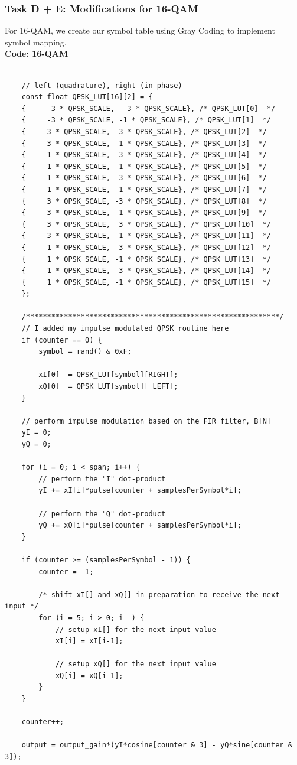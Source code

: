\documentclass{article}
\begin{document}
\subsubsection{Task D + E: Modifications for 16-QAM}
For 16-QAM, we create our symbol table using Gray Coding to implement symbol mapping.
\\
\textbf{Code: 16-QAM}

\begin{verbatim}

	// left (quadrature), right (in-phase)
	const float QPSK_LUT[16][2] = {
	{     -3 * QPSK_SCALE,  -3 * QPSK_SCALE}, /* QPSK_LUT[0]  */
	{     -3 * QPSK_SCALE, -1 * QPSK_SCALE}, /* QPSK_LUT[1]  */
	{    -3 * QPSK_SCALE,  3 * QPSK_SCALE}, /* QPSK_LUT[2]  */
	{    -3 * QPSK_SCALE,  1 * QPSK_SCALE}, /* QPSK_LUT[3]  */
	{    -1 * QPSK_SCALE, -3 * QPSK_SCALE}, /* QPSK_LUT[4]  */
	{    -1 * QPSK_SCALE, -1 * QPSK_SCALE}, /* QPSK_LUT[5]  */
	{    -1 * QPSK_SCALE,  3 * QPSK_SCALE}, /* QPSK_LUT[6]  */
	{    -1 * QPSK_SCALE,  1 * QPSK_SCALE}, /* QPSK_LUT[7]  */
	{     3 * QPSK_SCALE, -3 * QPSK_SCALE}, /* QPSK_LUT[8]  */
	{     3 * QPSK_SCALE, -1 * QPSK_SCALE}, /* QPSK_LUT[9]  */
	{     3 * QPSK_SCALE,  3 * QPSK_SCALE}, /* QPSK_LUT[10]  */
	{     3 * QPSK_SCALE,  1 * QPSK_SCALE}, /* QPSK_LUT[11]  */
	{     1 * QPSK_SCALE, -3 * QPSK_SCALE}, /* QPSK_LUT[12]  */
	{     1 * QPSK_SCALE, -1 * QPSK_SCALE}, /* QPSK_LUT[13]  */
	{     1 * QPSK_SCALE,  3 * QPSK_SCALE}, /* QPSK_LUT[14]  */
	{     1 * QPSK_SCALE, -1 * QPSK_SCALE}, /* QPSK_LUT[15]  */
	};

	/************************************************************/
	// I added my impulse modulated QPSK routine here
	if (counter == 0) {
		symbol = rand() & 0xF;

		xI[0]  = QPSK_LUT[symbol][RIGHT];  
		xQ[0]  = QPSK_LUT[symbol][ LEFT];   
	}

	// perform impulse modulation based on the FIR filter, B[N]
	yI = 0;
	yQ = 0;

	for (i = 0; i < span; i++) {
		// perform the "I" dot-product
		yI += xI[i]*pulse[counter + samplesPerSymbol*i];	

		// perform the "Q" dot-product
		yQ += xQ[i]*pulse[counter + samplesPerSymbol*i];	
	}

	if (counter >= (samplesPerSymbol - 1)) {
		counter = -1; 

		/* shift xI[] and xQ[] in preparation to receive the next input */
		for (i = 5; i > 0; i--) {
			// setup xI[] for the next input value
			xI[i] = xI[i-1];  

			// setup xQ[] for the next input value
			xQ[i] = xQ[i-1];  
		}
	}

	counter++;

	output = output_gain*(yI*cosine[counter & 3] - yQ*sine[counter & 3]);
\end{verbatim}
\end{document}
